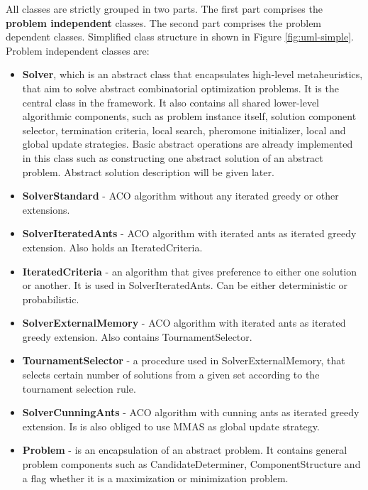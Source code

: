 \documentclass[11pt,a4paper,oneside]{book}
\begin{document}
All classes are strictly grouped in two parts. The first part comprises the \textbf{problem independent} classes. The second part comprises the problem dependent classes. Simplified class structure in shown in Figure \ref{fig:uml-simple}. Problem independent classes are:

\begin{itemize}
\item \textbf{Solver}, which is an abstract class that encapsulates high-level metaheuristics, that aim to solve abstract combinatorial optimization problems. It is the central class in the framework. It also contains all shared lower-level algorithmic components, such as problem instance itself, solution component selector, termination criteria, local search, pheromone initializer, local and global update strategies. Basic abstract operations are already implemented in this class such as constructing one abstract solution of an abstract problem. Abstract solution description will be given later.

\item \textbf{SolverStandard} - ACO algorithm without any iterated greedy or other extensions.

\item \textbf{SolverIteratedAnts} - ACO algorithm with iterated ants as iterated greedy extension. Also holds an IteratedCriteria.

\item \textbf{IteratedCriteria} - an algorithm that gives preference to either one solution or another. It is used in SolverIteratedAnts. Can be either deterministic or probabilistic.

\item \textbf{SolverExternalMemory} - ACO algorithm with iterated ants as iterated greedy extension. Also contains TournamentSelector.

\item \textbf{TournamentSelector} - a procedure used in SolverExternalMemory, that selects certain number of solutions from a given set according to the tournament selection rule.

\item \textbf{SolverCunningAnts} - ACO algorithm with cunning ants as iterated greedy extension. Is is also obliged to use MMAS as global update strategy.

\item \textbf{Problem} - is an encapsulation of an abstract problem. It contains general problem components such as CandidateDeterminer, ComponentStructure and a flag whether it is a maximization or minimization problem.


\end{itemize}
\end{document}
